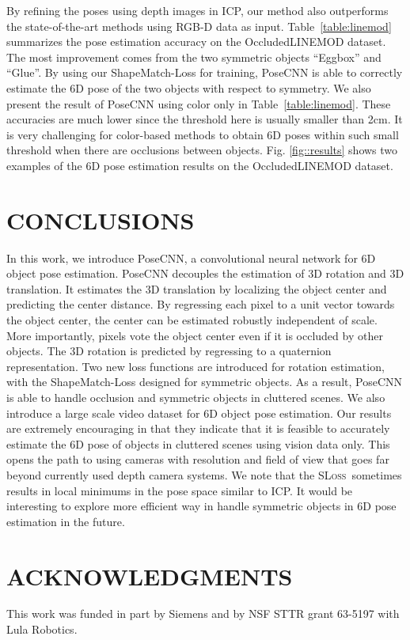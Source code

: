 \documentclass[conference]{IEEEtran}
\newcommand{\sloss}{\textsc{SLoss}}
\begin{document}
By refining the poses using depth images in ICP, our method also outperforms the state-of-the-art methods using RGB-D data as input. Table~\ref{table:linemod} summarizes the pose estimation accuracy on the OccludedLINEMOD dataset. The most improvement comes from the two symmetric objects ``Eggbox'' and ``Glue''. By using our ShapeMatch-Loss for training, PoseCNN is able to correctly estimate the 6D pose of the two objects with respect to symmetry. We also present the result of PoseCNN using color only in Table~\ref{table:linemod}. These accuracies are much lower since the threshold here is usually smaller than 2cm. It is very challenging for color-based methods to obtain 6D poses within such small threshold when there are occlusions between objects. Fig. \ref{fig::results} shows two examples of the 6D pose estimation results on the OccludedLINEMOD dataset.

\section{CONCLUSIONS}

In this work, we introduce PoseCNN, a convolutional neural network for 6D object pose estimation. PoseCNN decouples the estimation of 3D rotation and 3D translation. It estimates the 3D translation by localizing the object center and predicting the center distance. By regressing each pixel to a unit vector towards the object center, the center can be estimated robustly independent of scale. More importantly, pixels vote the object center even if it is occluded by other objects. The 3D rotation is predicted by regressing to a quaternion representation. Two new loss functions are introduced for rotation estimation, with the ShapeMatch-Loss designed for symmetric objects. As a result, PoseCNN is able to handle occlusion and symmetric objects in cluttered scenes. We also introduce a large scale video dataset for 6D object pose estimation. Our results are extremely encouraging in that they indicate that it is feasible to accurately estimate the 6D pose of objects in cluttered scenes using vision data only. This opens the path to using cameras with resolution and field of view that goes far beyond currently used depth camera systems. We note that the \sloss\ sometimes results in local minimums in the pose space similar to ICP. It would be interesting to explore more efficient way in handle symmetric objects in 6D pose estimation in the future.

\vspace{-2mm}
\section*{ACKNOWLEDGMENTS}

This work was funded in part by Siemens and by NSF STTR grant 63-5197 with Lula Robotics.



\end{document}
